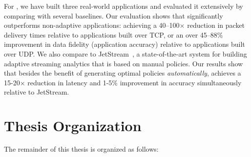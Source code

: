 \documentclass[thesis.tex]{subfiles}
\begin{document}
For \awstream{}, we have built three real-world applications and evaluated it
extensively by comparing with several baselines.  Our evaluation shows that
\awstream{} significantly outperforms non-adaptive applications: achieving a
40--100$\times$ reduction in packet delivery times relative to applications
built over TCP, or an over 45--88\% improvement in data fidelity (application
accuracy) relative to applications built over UDP. We also compare \awstream{}
to JetStream~\cite{rabkin2014aggregation}, a state-of-the-art system for
building adaptive streaming analytics that is based on manual policies. Our
results show that besides the benefit of generating optimal policies
\textit{automatically}, \awstream{} achieves a 15-20$\times$ reduction in
latency and 1-5\% improvement in accuracy simultaneously relative to JetStream.

\section{Thesis Organization}
\label{sec:thesis-organization}

The remainder of this thesis is organized as follows:
\end{document}
